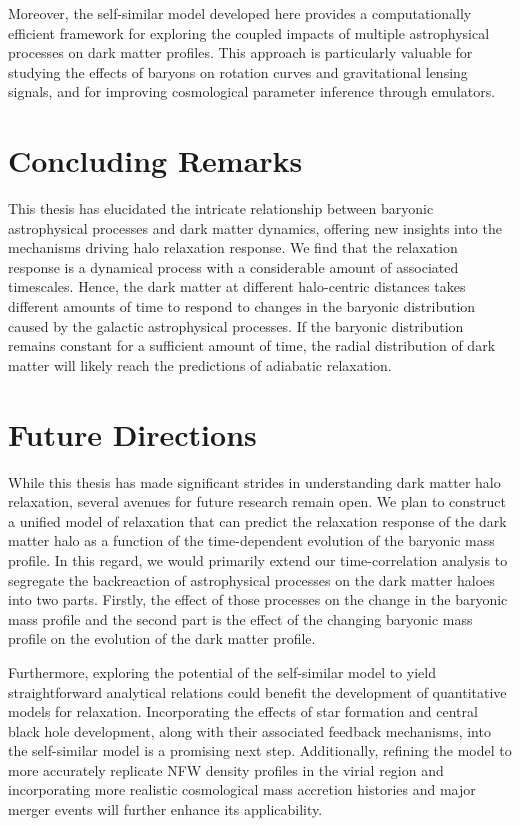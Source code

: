 Moreover, the self-similar model developed here provides a computationally efficient framework for exploring the coupled impacts of multiple astrophysical processes on dark matter profiles. This approach is particularly valuable for studying the effects of baryons on rotation curves and gravitational lensing signals, and for improving cosmological parameter inference through emulators.

\section{Concluding Remarks}
This thesis has elucidated the intricate relationship between baryonic astrophysical processes and dark matter dynamics, offering new insights into the mechanisms driving halo relaxation response. We find that the relaxation response is a dynamical process with a considerable amount of  associated timescales. Hence, the dark matter at different halo-centric distances takes different amounts of time to respond to changes in the baryonic distribution caused by the galactic astrophysical processes. If the baryonic distribution remains constant for a sufficient amount of time, the radial distribution of dark matter will likely reach the predictions of adiabatic relaxation.

\section{Future Directions}
While this thesis has made significant strides  in understanding dark matter halo relaxation, several avenues for future research remain open. We plan to construct a unified model of relaxation that can predict the relaxation response of the dark matter halo as a function of the time-dependent evolution of the baryonic mass profile. In this regard, we would primarily extend our time-correlation analysis to segregate the backreaction of astrophysical processes on the dark matter haloes into two parts. Firstly, the effect of those processes on the change in the baryonic mass profile and the second part is the effect of the changing baryonic mass profile on the evolution of the dark matter profile.

Furthermore, exploring the potential of the self-similar model to yield straightforward analytical relations could benefit the development of quantitative models for relaxation. Incorporating the effects of star formation and central black hole development, along with their associated feedback mechanisms, into the self-similar model is a promising next step. Additionally, refining the model to more accurately replicate NFW density profiles in the virial region and incorporating more realistic cosmological mass accretion histories and major merger events will further enhance its applicability. 
